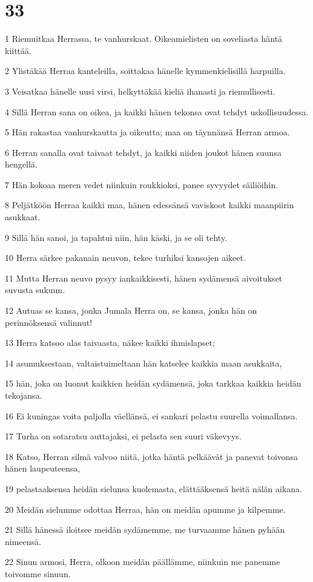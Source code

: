 \chapter{33}

\par 1 Riemuitkaa Herrassa, te vanhurskaat. Oikeamielisten on soveliasta häntä kiittää.
\par 2 Ylistäkää Herraa kanteleilla, soittakaa hänelle kymmenkielisillä harpuilla.
\par 3 Veisatkaa hänelle uusi virsi, helkyttäkää kieliä ihanasti ja riemullisesti.
\par 4 Sillä Herran sana on oikea, ja kaikki hänen tekonsa ovat tehdyt uskollisuudessa.
\par 5 Hän rakastaa vanhurskautta ja oikeutta; maa on täynnänsä Herran armoa.
\par 6 Herran sanalla ovat taivaat tehdyt, ja kaikki niiden joukot hänen suunsa hengellä.
\par 7 Hän kokoaa meren vedet niinkuin roukkioksi, panee syvyydet säiliöihin.
\par 8 Peljätköön Herraa kaikki maa, hänen edessänsä vaviskoot kaikki maanpiirin asukkaat.
\par 9 Sillä hän sanoi, ja tapahtui niin, hän käski, ja se oli tehty.
\par 10 Herra särkee pakanain neuvon, tekee turhiksi kansojen aikeet.
\par 11 Mutta Herran neuvo pysyy iankaikkisesti, hänen sydämensä aivoitukset suvusta sukuun.
\par 12 Autuas se kansa, jonka Jumala Herra on, se kansa, jonka hän on perinnöksensä valinnut!
\par 13 Herra katsoo alas taivaasta, näkee kaikki ihmislapset;
\par 14 asumuksestaan, valtaistuimeltaan hän katselee kaikkia maan asukkaita,
\par 15 hän, joka on luonut kaikkien heidän sydämensä, joka tarkkaa kaikkia heidän tekojansa.
\par 16 Ei kuningas voita paljolla väellänsä, ei sankari pelastu suurella voimallansa.
\par 17 Turha on sotaratsu auttajaksi, ei pelasta sen suuri väkevyys.
\par 18 Katso, Herran silmä valvoo niitä, jotka häntä pelkäävät ja panevat toivonsa hänen laupeuteensa,
\par 19 pelastaaksensa heidän sielunsa kuolemasta, elättääksensä heitä nälän aikana.
\par 20 Meidän sielumme odottaa Herraa, hän on meidän apumme ja kilpemme.
\par 21 Sillä hänessä iloitsee meidän sydämemme, me turvaamme hänen pyhään nimeensä.
\par 22 Sinun armosi, Herra, olkoon meidän päällämme, niinkuin me panemme toivomme sinuun.

